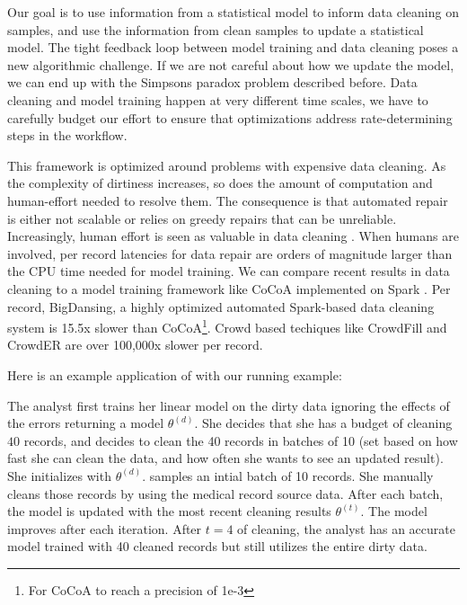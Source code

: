 Our goal is to use information from a statistical model to inform data cleaning on samples, and use the information from clean samples to update a statistical model.
The tight feedback loop between model training and data cleaning poses a new algorithmic challenge. 
If we are not careful about how we update the model, we can end up with the Simpsons paradox problem described before.
Data cleaning and model training happen at very different time scales, we have to carefully budget our effort to ensure that optimizations address rate-determining steps in the workflow.

This framework is optimized around problems with expensive data cleaning.
As the complexity of dirtiness increases, so does the amount of computation and human-effort needed to resolve them.
The consequence is that automated repair is either not scalable or relies on greedy repairs that can be unreliable.
Increasingly, human effort is seen as valuable in data cleaning \cite{park2014crowdfill, wang2012crowder, gokhale2014corleone, wang1999sample}.
When humans are involved, per record latencies for data repair are orders of magnitude larger than the CPU time needed for model training.
We can compare recent results in data cleaning to a model training framework like CoCoA implemented on Spark \cite{jaggi2014communication}.
Per record, BigDansing, a highly optimized automated Spark-based data cleaning system is 15.5x slower than CoCoA\footnote{For CoCoA to reach a precision of 1e-3}.
Crowd based techiques like CrowdFill \cite{park2014crowdfill} and CrowdER \cite{wang2012crowder} are over 100,000x slower per record.

\noindent Here is an example application of \sys with our running example:
\begin{example}
The analyst first trains her linear model on the dirty data ignoring the effects of the errors returning a model $\theta^{(d)}$.
She decides that she has a budget of cleaning $40$ records, and decides to clean the 40 records in batches of 10 (set based on how fast she can clean the data, and how often she wants to see an updated result).
She initializes \sys with $\theta^{(d)}$.
\sys samples an intial batch of 10 records.
She manually cleans those records by using the medical record source data.
After each batch, the model is updated with the most recent cleaning results $\theta^{(t)}$.
The model improves after each iteration.
After $t=4$ of cleaning, the analyst has an accurate model trained with 40 cleaned records but still utilizes the entire dirty data.
\end{example}

